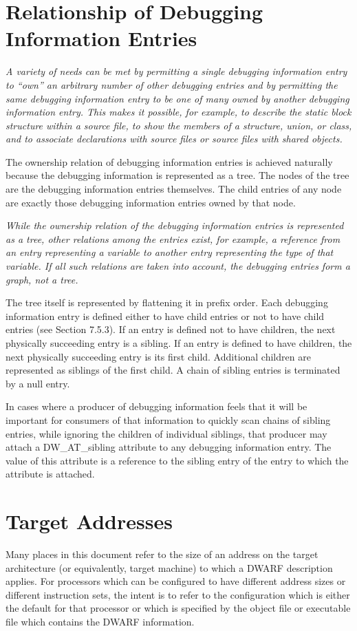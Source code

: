 \section{Relationship of Debugging Information Entries}
\label{chap:relationshipofdebugginginformationentries}
\textit{
A variety of needs can be met by permitting a single
debugging information entry to “own” an arbitrary number
of other debugging entries and by permitting the same debugging
information entry to be one of many owned by another debugging
information entry. 
This makes it possible, for example, to
describe the static block structure within a source file,
to show the members of a structure, union, or class, and to
associate declarations with source files or source files
with shared objects.  
}


The ownership relation of debugging
information entries is achieved naturally because the debugging
information is represented as a tree. 
The nodes of the tree
are the debugging information entries themselves. 
The child
entries of any node are exactly those debugging information
entries owned by that node.  

\textit{
While the ownership relation
of the debugging information entries is represented as a
tree, other relations among the entries exist, for example,
a reference from an entry representing a variable to another
entry representing the type of that variable. 
If all such
relations are taken into account, the debugging entries
form a graph, not a tree.  
}

The tree itself is represented
by flattening it in prefix order. 
Each debugging information
entry is defined either to have child entries or not to have
child entries (see Section 7.5.3). 
If an entry is defined not
to have children, the next physically succeeding entry is a
sibling. 
If an entry is defined to have children, the next
physically succeeding entry is its first child. 
Additional
children are represented as siblings of the first child. 
A chain of sibling entries is terminated by a null entry.

In cases where a producer of debugging information feels that
it will be important for consumers of that information to
quickly scan chains of sibling entries, while ignoring the
children of individual siblings, that producer may attach a
DW\_AT\_sibling attribute to any debugging information entry. 
The
value of this attribute is a reference to the sibling entry
of the entry to which the attribute is attached.


\section{Target Addresses}
\label{chap:targetaddresses}
Many places in this document refer to the size of an address
on the target architecture (or equivalently, target machine)
to which a DWARF description applies. For processors which
can be configured to have different address sizes or different
instruction sets, the intent is to refer to the configuration
which is either the default for that processor or which is
specified by the object file or executable file which contains
the DWARF information.



